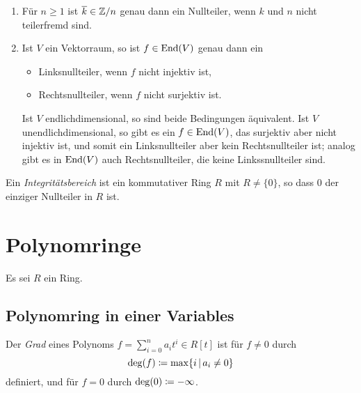 \begin{example}
  \begin{enumerate}
    \item
      Für $n \geq 1$ ist $\overline{k} \in \mathbb{Z}/n$ genau dann ein Nullteiler, wenn $k$ und $n$ nicht teilerfremd sind.
    \item
      Ist $V$ ein Vektorraum, so ist $f \in \operatorname{End}(V)$ genau dann ein
      \begin{itemize}
        \item
          Linksnullteiler, wenn $f$ nicht injektiv ist,
        \item
          Rechtsnullteiler, wenn $f$ nicht surjektiv ist.
      \end{itemize}
      Ist $V$ endlichdimensional, so sind beide Bedingungen äquivalent.
      Ist $V$ unendlichdimensional, so gibt es ein $f \in \operatorname{End}(V)$, das surjektiv aber nicht injektiv ist, und somit ein Linksnullteiler aber kein Rechtsnullteiler ist;
      analog gibt es in $\operatorname{End}(V)$ auch Rechtsnullteiler, die keine Linkssnullteiler sind.
  \end{enumerate}
\end{example}


\begin{definition}
  Ein \emph{Integritätsbereich} ist ein kommutativer Ring $R$ mit $R \neq \{0\}$, so dass $0$ der einziger Nullteiler in $R$ ist.
\end{definition}





\section{Polynomringe}

Es sei $R$ ein Ring.



\subsection{Polynomring in einer Variables}

\begin{definition}
  Der \emph{Grad} eines Polynoms $f = \sum_{i=0}^n a_i t^i \in R[t]$ ist für $f \neq 0$ durch
  \[
              \deg(f)
    \defined  \max \{i \suchthat a_i \neq 0\}
  \]
  definiert, und für $f = 0$ durch $\deg(0) \coloneqq -\infty$.
\end{definition}


